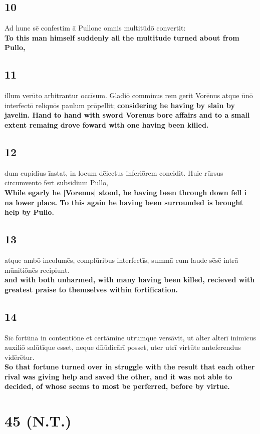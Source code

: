 \documentclass{article}
\begin{document}
\subsection*{10}
Ad hunc sē confestim ā Pullone omnis multitūdō convertit: \\
\textbf{To this man himself suddenly all the multitude turned about from Pullo,}

\subsection*{11}
illum verūto arbitrantur occīsum. Gladiō comminus rem gerit Vorēnus atque ūnō interfectō reliquōs paulum prōpellit; 
\textbf{considering he having by slain by javelin. Hand to hand with sword Vorenus bore affairs and to a small extent remaing drove foward with one having been killed.}

\subsection*{12}
dum cupidius īnstat, in locum dēiectus inferiōrem concidit. Huic rūrsus circumventō fert subsidium Pullō, \\
\textbf{While egarly he [Vorenus] stood, he having been through down fell i na lower place. To this again he having been surrounded is brought help by Pullo.}

\subsection*{13}
atque ambō incolumēs, complūribus interfectīs, summā cum laude sēsē intrā mūnitiōnēs recipiunt. \\
\textbf{and with both unharmed, with many having been killed, recieved with greatest praise to themselves within fortification.}

\subsection*{14}
Sīc fortūna in contentiōne et certāmine utrumque versāvit, ut alter alterī inimīcus auxiliō salūtīque esset, neque dīiūdicārī posset, uter utrī virtūte anteferendus vidērētur.\\
\textbf{So that fortune turned over in struggle with the result that each other rival was giving help and saved the other, and it was not able to decided, of whose seems to most be perferred, before by virtue.}


\section*{45 (N.T.)}
\end{document}
